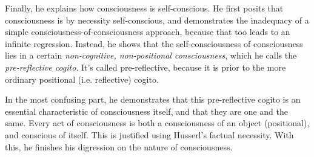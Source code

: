 Finally, he explains how consciousness is self-conscious. He first posits that consciousness is by necessity self-conscious, and demonstrates the inadequacy of a simple consciousness-of-consciousness approach, because that too leads to an infinite regression. Instead, he shows that the self-consciousness of consciousness lies in a certain \emph{non-cognitive, non-positional consciousness}, which he calls the \emph{pre-reflective cogito}. It's called pre-reflective, because it is prior to the more ordinary positional (i.e. reflective) cogito.

In the most confusing part, he demonstrates that this pre-reflective cogito is an essential characteristic of consciousness itself, and that they are one and the same.
Every act of consciousness is both a consciousness of an object (positional), and conscious of itself. This is justified using Husserl's factual necessity. With this, he finishes his digression on the nature of consciousness.

